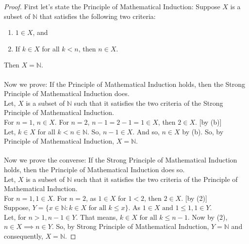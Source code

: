 \documentclass[12pt]{article}
\begin{document}
\begin{proof}
First let's state the Principle of Mathematical Induction: Suppose \( X \) is a subset of \( \mathbb{N} \) that satisfies the following two criteria:
\begin{enumerate}
    \item \( 1 \in X \), and
    \item If \( k \in X \) for all \( k < n \), then \( n \in X \).
\end{enumerate}
Then \( X = \mathbb{N} \).\\\\ 
Now we prove: If the Principle of Mathematical Induction holds, then the Strong Principle of Mathematical Induction does.\\
Let, $X$ is a subset of $\mathbb{N}$ such that it satisfies the two criteria of the Strong Principle of Mathematical Induction. \\
For $n = 1$, $n \in X$. For $n = 2$, $n-1 = 2-1 = 1 \in X$, then $2 \in X$. {[by (b)]}\\
Let, $k \in X$ for all $k < n \in \mathbb{N}$. So, $n-1 \in X$. And so, $n \in X$ by (b). So, by Principle of Mathematical Induction, $X = \mathbb{N}$.\\\\
Now we prove the converse: If the Strong Principle of Mathematical Induction holds, then the Principle of Mathematical Induction does so. \\
Let, $X$ is a subset of $\mathbb{N}$ such that it satisfies the two criteria of the Principle of Mathematical Induction. \\
For $n = 1, 1 \in X$. For $n = 2$, as $1 \in X$ for $1 < 2$, then $2 \in X$. {[by (2)]} \\
Suppose, $Y = \{ x\in \mathbb{N} : k\in X \text{ for all } k \leq x \}$. As $1\in X \text{ and } 1 \leq 1, 1\in Y$.\\
Let, for $n>1, n-1 \in Y$. That means, $k \in X \text{ for all } k \leq n-1$. Now by (2), $n\in X \implies n\in Y$. So, by Strong Principle of Mathematical Induction, $Y = \mathbb{N}$ and consequently, $X = \mathbb{N}$.

\end{proof}














 
\end{document}
